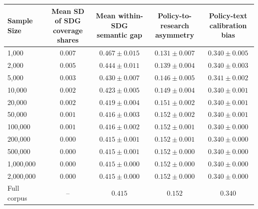 \begin{tabular}{lcccc}
\toprule
Sample Size & \shortstack{Mean SD of SDG\\coverage shares} & \shortstack{Mean within-SDG\\semantic gap} & \shortstack{Policy-to-research\\asymmetry} & \shortstack{Policy-text\\calibration bias} \\
\midrule
1,000 & $0.007$ & $0.467 \pm 0.015$ & $0.131 \pm 0.007$ & $0.340 \pm 0.005$ \\
2,000 & $0.005$ & $0.444 \pm 0.011$ & $0.139 \pm 0.004$ & $0.340 \pm 0.003$ \\
5,000 & $0.003$ & $0.430 \pm 0.007$ & $0.146 \pm 0.005$ & $0.341 \pm 0.002$ \\
10,000 & $0.002$ & $0.423 \pm 0.005$ & $0.149 \pm 0.004$ & $0.340 \pm 0.001$ \\
20,000 & $0.002$ & $0.419 \pm 0.004$ & $0.151 \pm 0.002$ & $0.340 \pm 0.001$ \\
50,000 & $0.001$ & $0.416 \pm 0.003$ & $0.152 \pm 0.002$ & $0.340 \pm 0.001$ \\
100,000 & $0.001$ & $0.416 \pm 0.002$ & $0.152 \pm 0.001$ & $0.340 \pm 0.000$ \\
200,000 & $0.000$ & $0.415 \pm 0.001$ & $0.152 \pm 0.001$ & $0.340 \pm 0.000$ \\
500,000 & $0.000$ & $0.415 \pm 0.001$ & $0.152 \pm 0.000$ & $0.340 \pm 0.000$ \\
1,000,000 & $0.000$ & $0.415 \pm 0.000$ & $0.152 \pm 0.000$ & $0.340 \pm 0.000$ \\
2,000,000 & $0.000$ & $0.415 \pm 0.000$ & $0.152 \pm 0.000$ & $0.340 \pm 0.000$ \\
Full corpus & -- & $0.415$ & $0.152$ & $0.340$ \\
\bottomrule
\end{tabular}
